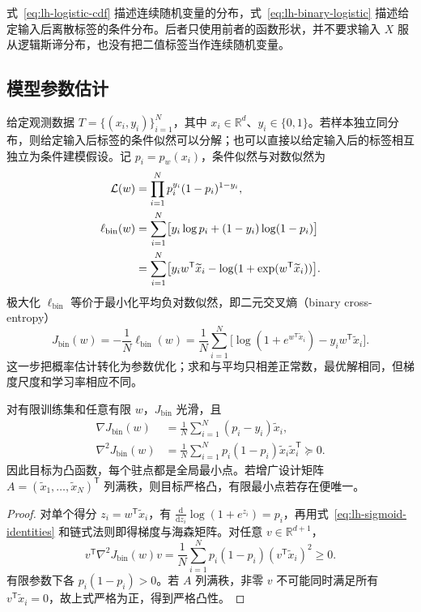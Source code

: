 \begin{notealert}[type=caution,title={分布与条件模型的区别}]
式~\eqref{eq:lh-logistic-cdf} 描述连续随机变量的分布，式~\eqref{eq:lh-binary-logistic} 描述给定输入后离散标签的条件分布。后者只使用前者的函数形状，并不要求输入 $X$ 服从逻辑斯谛分布，也没有把二值标签当作连续随机变量。
\end{notealert}

\subsection{模型参数估计}
\label{subsec:lh-logistic-estimation}

给定观测数据 $T=\{(x_i,y_i)\}_{i=1}^N$，其中 $x_i\in\mathbb R^d$、$y_i\in\{0,1\}$。若样本独立同分布，则给定输入后标签的条件似然可以分解；也可以直接以给定输入后的标签相互独立为条件建模假设。记 $p_i=p_w(x_i)$，条件似然与对数似然为
\begin{align}
\mathcal L(w)&=\prod_{i=1}^N p_i^{y_i}(1-p_i)^{1-y_i},\notag\\
\ell_{\mathrm{bin}}(w)&=\sum_{i=1}^N\bigl[y_i\log p_i+(1-y_i)\log(1-p_i)\bigr]\notag\\
&=\sum_{i=1}^N\bigl[y_iw^{\mathsf T}\widetilde x_i
-\log(1+\exp(w^{\mathsf T}\widetilde x_i))\bigr].
\label{eq:lh-logistic-loglik}
\end{align}
极大化 $\ell_{\mathrm{bin}}$ 等价于最小化平均负对数似然，即二元交叉熵（binary cross-entropy）
\begin{equation}
J_{\mathrm{bin}}(w)=-\frac1N\ell_{\mathrm{bin}}(w)
=\frac1N\sum_{i=1}^N\bigl[\log(1+e^{w^{\mathsf T}\widetilde x_i})
-y_iw^{\mathsf T}\widetilde x_i\bigr].
\label{eq:lh-logistic-objective}
\end{equation}
这一步把概率估计转化为参数优化；求和与平均只相差正常数，最优解相同，但梯度尺度和学习率相应不同。

\begin{proposition}[梯度与凸性]
\label{prop:lh-logistic-convexity}
对有限训练集和任意有限 $w$，$J_{\mathrm{bin}}$ 光滑，且
\begin{align}
\nabla J_{\mathrm{bin}}(w)&=\frac1N\sum_{i=1}^N(p_i-y_i)\widetilde x_i,
\label{eq:lh-logistic-gradient}\\
\nabla^2J_{\mathrm{bin}}(w)&=\frac1N\sum_{i=1}^Np_i(1-p_i)
\widetilde x_i\widetilde x_i^{\mathsf T}\succeq0.
\label{eq:lh-logistic-hessian}
\end{align}
因此目标为凸函数，每个驻点都是全局最小点。若增广设计矩阵 $A=(\widetilde x_1,\ldots,\widetilde x_N)^{\mathsf T}$ 列满秩，则目标严格凸，有限最小点若存在便唯一。
\end{proposition}
\begin{proof}
对单个得分 $z_i=w^{\mathsf T}\widetilde x_i$，有 $\frac{\mathrm d}{\mathrm dz_i}\log(1+e^{z_i})=p_i$，再用式~\eqref{eq:lh-sigmoid-identities} 和链式法则即得梯度与海森矩阵。对任意 $v\in\mathbb R^{d+1}$，
\[
v^{\mathsf T}\nabla^2J_{\mathrm{bin}}(w)v
=\frac1N\sum_{i=1}^Np_i(1-p_i)(v^{\mathsf T}\widetilde x_i)^2\geq0.
\]
有限参数下各 $p_i(1-p_i)>0$。若 $A$ 列满秩，非零 $v$ 不可能同时满足所有 $v^{\mathsf T}\widetilde x_i=0$，故上式严格为正，得到严格凸性。
\end{proof}

